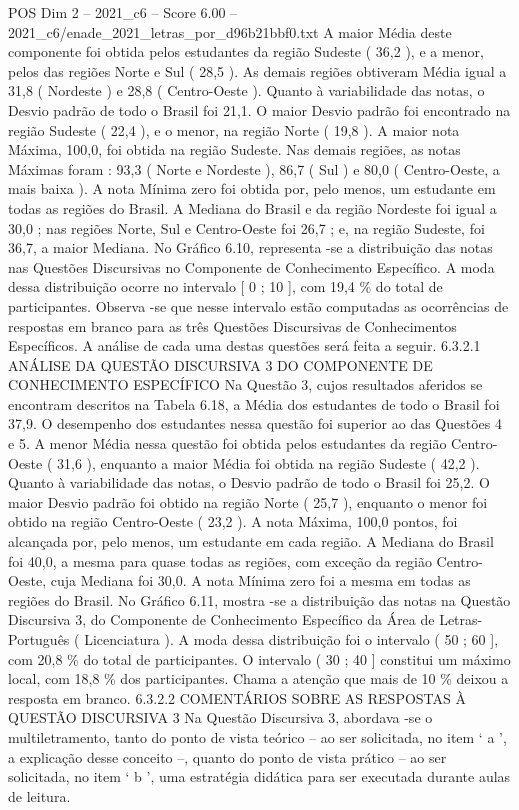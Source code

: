 \begin{textsample}{POS Dim 2 – 2021\_c6 – Score 6.00 – 2021\_c6/enade\_2021\_letras\_por\_d96b21bbf0.txt}
A maior Média deste componente foi obtida pelos estudantes da região Sudeste ( 36,2 ), e a menor, pelos das regiões Norte e Sul ( 28,5 ).
As demais regiões obtiveram Média igual a 31,8 ( Nordeste ) e 28,8 ( Centro-Oeste ).
Quanto à variabilidade das notas, o Desvio padrão de todo o Brasil foi 21,1.
O maior Desvio padrão foi encontrado na região Sudeste ( 22,4 ), e o menor, na região Norte ( 19,8 ).
A maior nota Máxima, 100,0, foi obtida na região Sudeste.
Nas demais regiões, as notas Máximas foram : 93,3 ( Norte e Nordeste ), 86,7 ( Sul ) e 80,0 ( Centro-Oeste, a mais baixa ).
A nota Mínima zero foi obtida por, pelo menos, um estudante em todas as regiões do Brasil.
A Mediana do Brasil e da região Nordeste foi igual a 30,0 ; nas regiões Norte, Sul e Centro-Oeste foi 26,7 ; e, na região Sudeste, foi 36,7, a maior Mediana.
No Gráfico 6.10, representa -se a distribuição das notas nas Questões Discursivas no Componente de Conhecimento Específico.
A moda dessa distribuição ocorre no intervalo [ 0 ; 10 ], com 19,4 \% do total de participantes.
Observa -se que nesse intervalo estão computadas as ocorrências de respostas em branco para as três Questões Discursivas de Conhecimentos Específicos.
A análise de cada uma destas questões será feita a seguir. 6.3.2.1 ANÁLISE DA QUESTÃO DISCURSIVA 3 DO COMPONENTE DE CONHECIMENTO ESPECÍFICO Na Questão 3, cujos resultados aferidos se encontram descritos na Tabela 6.18, a Média dos estudantes de todo o Brasil foi 37,9.
O desempenho dos estudantes nessa questão foi superior ao das Questões 4 e 5.
A menor Média nessa questão foi obtida pelos estudantes da região Centro-Oeste ( 31,6 ), enquanto a maior Média foi obtida na região Sudeste ( 42,2 ).
Quanto à variabilidade das notas, o Desvio padrão de todo o Brasil foi 25,2.
O maior Desvio padrão foi obtido na região Norte ( 25,7 ), enquanto o menor foi obtido na região Centro-Oeste ( 23,2 ).
A nota Máxima, 100,0 pontos, foi alcançada por, pelo menos, um estudante em cada região.
A Mediana do Brasil foi 40,0, a mesma para quase todas as regiões, com exceção da região Centro-Oeste, cuja Mediana foi 30,0.
A nota Mínima zero foi a mesma em todas as regiões do Brasil.
No Gráfico 6.11, mostra -se a distribuição das notas na Questão Discursiva 3, do Componente de Conhecimento Específico da Área de Letras-Português ( Licenciatura ).
A moda dessa distribuição foi o intervalo ( 50 ; 60 ], com 20,8 \% do total de participantes.
O intervalo ( 30 ; 40 ] constitui um máximo local, com 18,8 \% dos participantes.
Chama a atenção que mais de 10 \% deixou a resposta em branco. 6.3.2.2 COMENTÁRIOS SOBRE AS RESPOSTAS À QUESTÃO DISCURSIVA 3 Na Questão Discursiva 3, abordava -se o multiletramento, tanto do ponto de vista teórico – ao ser solicitada, no item ‘ a ’, a explicação desse conceito –, quanto do ponto de vista prático – ao ser solicitada, no item ‘ b ’, uma estratégia didática para ser executada durante aulas de leitura.

\end{textsample}
